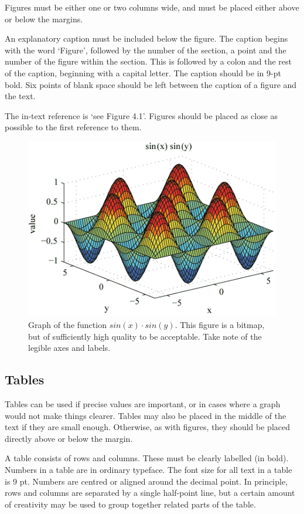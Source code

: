 Figures must be either one or two columns wide, and must be placed either above or below the margins.

An explanatory caption must be included below the figure.
The caption begins with the word ‘Figure’, followed by the number of the section, a point and the number of the figure within the section.
This is followed by a colon and the rest of the caption, beginning with a capital letter.
The caption should be in 9-pt bold.
Six points of blank space should be left between the caption of a figure and the text.

The in-text reference is ‘see Figure 4.1’.
Figures should be placed as close as possible to the first reference to them.

\begin{figure}[h]
  \centering
  \includegraphics[width=\linewidth]{img/grafiek.png}
  \caption{Graph of the function $sin(x) \cdot sin(y)$.
    This figure is a bitmap, but of sufficiently high quality to be acceptable.
    Take note of the legible axes and labels.
  }\label{fig:afb1}
\end{figure}

\subsection{Tables}\label{sec_tables}
Tables can be used if precise values are important, or in cases where a graph would not make things clearer.
Tables may also be placed in the middle of the text if they are small enough.
Otherwise, as with figures, they should be placed directly above or below the margin.

A table consists of rows and columns.
These must be clearly labelled (in bold).
Numbers in a table are in ordinary typeface.
The font size for all text in a table is 9 pt.
Numbers are centred or aligned around the decimal point.
In principle, rows and columns are separated by a single half-point line, but a certain amount of creativity may be used to group together related parts of the table.

